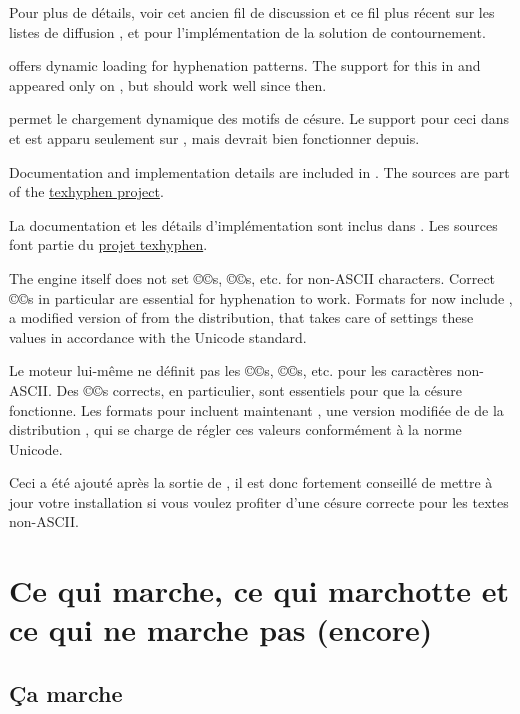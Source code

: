 \documentclass{lltxdoc}
\begin{document}
Pour plus de détails, voir cet ancien fil de discussion et ce fil plus récent sur les listes de diffusion \luatex, et  pour l'implémentation de la solution de contournement.

\luatex offers dynamic loading for hyphenation patterns. The support for this in
 and  appeared only on , but should
work well since then.

\luatex permet le chargement dynamique des motifs de césure. Le support pour ceci dans  et  est apparu seulement sur , mais devrait bien fonctionner depuis.

Documentation and implementation details are included in
. The sources are part of the
\href{http://tug.org/tex-hyphen/}{texhyphen project}.

La documentation et les détails d'implémentation sont inclus dans . Les sources font partie du \href{http://tug.org/tex-hyphen/}{projet texhyphen}.

The engine itself does not set ©\catcode©s, ©\lccode©s, etc. for non-ASCII
characters. Correct ©\lccode©s in particular are essential for hyphenation to
work. Formats for \luatex now include , a
modified version of  from the \xetex distribution,
that takes care of settings these values in accordance with the Unicode
standard.

Le moteur lui-même ne définit pas les ©\catcode©s, ©\lccode©s, etc. pour les caractères non-ASCII. Des ©\lccode©s corrects, en particulier, sont essentiels pour que la césure fonctionne. Les formats pour \luatex incluent maintenant , une version modifiée de  de la distribution \xetex, qui se charge de régler ces valeurs conformément à la norme Unicode.

Ceci a été ajouté après la sortie de , il est donc fortement conseillé
de mettre à jour votre installation si vous voulez profiter d'une césure correcte
pour les textes non-ASCII.


\section{Ce qui marche, ce qui marchotte et ce qui ne marche pas (encore)}\label{workornot}

\subsection{Ça marche}\label{working}
\end{document}
